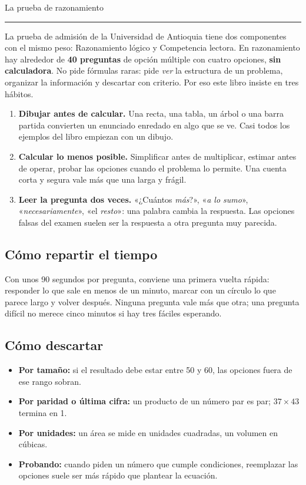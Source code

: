 \clearpage
\thispagestyle{vacia}
{\sffamily\fontsize{26}{30}\selectfont\firalight La prueba de razonamiento\par}\vspace{2pt}
{\color{zolive}\rule{18mm}{1.6pt}}\par\vspace{8pt}

La prueba de admisión de la Universidad de Antioquia tiene dos componentes con el mismo peso: Razonamiento lógico y
Competencia lectora. En razonamiento hay alrededor de \textbf{40 preguntas} de opción múltiple con cuatro opciones,
\textbf{sin calculadora}. No pide fórmulas raras: pide \emph{ver} la estructura de un problema, organizar la información
y descartar con criterio. Por eso este libro insiste en tres hábitos.

\begin{enumerate}[leftmargin=1.6em,itemsep=4pt]
  \item \textbf{Dibujar antes de calcular.} Una recta, una tabla, un árbol o una barra partida convierten un enunciado
  enredado en algo que se ve. Casi todos los ejemplos del libro empiezan con un dibujo.
  \item \textbf{Calcular lo menos posible.} Simplificar antes de multiplicar, estimar antes de operar, probar las opciones
  cuando el problema lo permite. Una cuenta corta y segura vale más que una larga y frágil.
  \item \textbf{Leer la pregunta dos veces.} «¿Cuántos \emph{más}?», «\emph{a lo sumo}», «\emph{necesariamente}», «el
  \emph{resto}»: una palabra cambia la respuesta. Las opciones falsas del examen suelen ser la respuesta a otra
  pregunta muy parecida.
\end{enumerate}

\subsection*{Cómo repartir el tiempo}
Con unos 90 segundos por pregunta, conviene una primera vuelta rápida: responder lo que sale en menos de un minuto,
marcar con un círculo lo que parece largo y volver después. Ninguna pregunta vale más que otra; una pregunta difícil no
merece cinco minutos si hay tres fáciles esperando.

\subsection*{Cómo descartar}
\begin{itemize}
  \item \textbf{Por tamaño:} si el resultado debe estar entre 50 y 60, las opciones fuera de ese rango sobran.
  \item \textbf{Por paridad o última cifra:} un producto de un número par es par; $37 \times 43$ termina en 1.
  \item \textbf{Por unidades:} un área se mide en unidades cuadradas, un volumen en cúbicas.
  \item \textbf{Probando:} cuando piden un número que cumple condiciones, reemplazar las opciones suele ser más rápido que
  plantear la ecuación.
\end{itemize}


